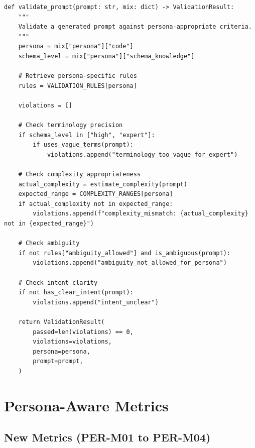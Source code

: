 \begin{lstlisting}[language=jsonx,caption={Critic prompt for persona-aware validation}]
def validate_prompt(prompt: str, mix: dict) -> ValidationResult:
    """
    Validate a generated prompt against persona-appropriate criteria.
    """
    persona = mix["persona"]["code"]
    schema_level = mix["persona"]["schema_knowledge"]
    
    # Retrieve persona-specific rules
    rules = VALIDATION_RULES[persona]
    
    violations = []
    
    # Check terminology precision
    if schema_level in ["high", "expert"]:
        if uses_vague_terms(prompt):
            violations.append("terminology_too_vague_for_expert")
    
    # Check complexity appropriateness
    actual_complexity = estimate_complexity(prompt)
    expected_range = COMPLEXITY_RANGES[persona]
    if actual_complexity not in expected_range:
        violations.append(f"complexity_mismatch: {actual_complexity} not in {expected_range}")
    
    # Check ambiguity
    if not rules["ambiguity_allowed"] and is_ambiguous(prompt):
        violations.append("ambiguity_not_allowed_for_persona")
    
    # Check intent clarity
    if not has_clear_intent(prompt):
        violations.append("intent_unclear")
    
    return ValidationResult(
        passed=len(violations) == 0,
        violations=violations,
        persona=persona,
        prompt=prompt,
    )
\end{lstlisting}

\section{Persona-Aware Metrics}
\label{sec:persona-metrics}

\subsection{New Metrics (PER-M01 to PER-M04)}

